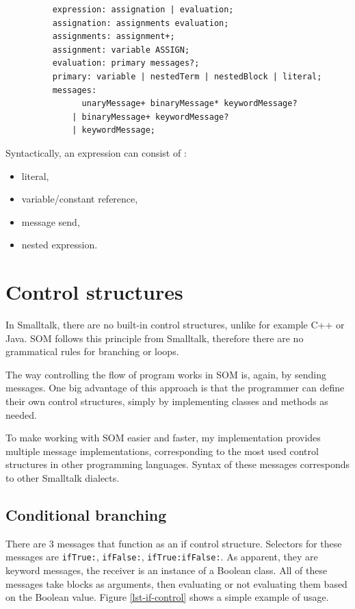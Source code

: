 \documentclass[thesis=M,english]{FITthesis}[2019/12/23]
\begin{document}
\begin{figure}
	\begin{verbatim}
	expression: assignation | evaluation;
	assignation: assignments evaluation;
	assignments: assignment+;
	assignment: variable ASSIGN;
	evaluation: primary messages?;
	primary: variable | nestedTerm | nestedBlock | literal;
	messages:
		  unaryMessage+ binaryMessage* keywordMessage?
		| binaryMessage+ keywordMessage?
		| keywordMessage;
	\end{verbatim}
\end{figure}

Syntactically, an expression can consist of \cite{smalltalk-essentials}:
\begin{itemize}
	\item literal,
	\item variable/constant reference,
	\item message send,
	\item nested expression.
\end{itemize}

\section{Control structures}
In Smalltalk, there are no built-in control structures, unlike for example C++ or Java. SOM follows this principle
from Smalltalk, therefore there are no grammatical rules for branching or loops.

The way controlling the flow of program works in SOM is, again, by sending messages. One big advantage of this 
approach is that the programmer can define their own control structures, simply by implementing classes and
methods as needed.

To make working with SOM easier and faster, my implementation provides multiple message implementations, 
corresponding to the most used control structures in other programming languages. Syntax of these messages
corresponds to other Smalltalk dialects.

\subsection{Conditional branching}
There are 3 messages that function as an if control structure. Selectors for these messages are \texttt{ifTrue:},
\texttt{ifFalse:}, \texttt{ifTrue:ifFalse:}. As apparent, they are keyword messages, the receiver is an instance of
a Boolean class. All of these messages take blocks as arguments, then evaluating or not evaluating them based on
the Boolean value. Figure \ref{lst-if-control} shows a simple example of usage.
\end{document}
